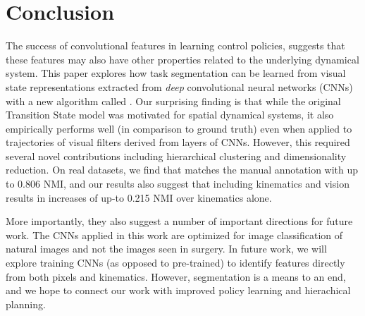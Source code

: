 \documentclass[0-main.tex]{subfiles}
\begin{document}
\section{Conclusion}
The success of convolutional features in learning control policies, suggests that these features may also have other properties related to the underlying dynamical system. 
This paper explores how task segmentation can be learned from visual state representations extracted from \textit{deep} convolutional neural networks (CNNs) with a new algorithm called \tsc.
Our surprising finding is that while the original Transition State model was motivated for spatial dynamical systems, it also empirically performs well (in comparison to ground truth) even when applied to trajectories of visual filters derived from layers of CNNs.
However, this required several novel contributions including hierarchical clustering and dimensionality reduction. 
On real datasets, we find that \tsc matches the manual annotation with up to 0.806 NMI, and our results also suggest that including kinematics and vision results in increases of up-to 0.215 NMI over kinematics alone.


More importantly, they also suggest a number of important directions for future work.
The CNNs applied in this work are optimized for image classification of natural images and not the images seen in surgery.
In future work, we will explore training CNNs (as opposed to pre-trained) to identify features directly from both pixels and kinematics. 
However, segmentation is a means to an end, and we hope to connect our work with improved policy learning and hierachical planning.
\end{document}
